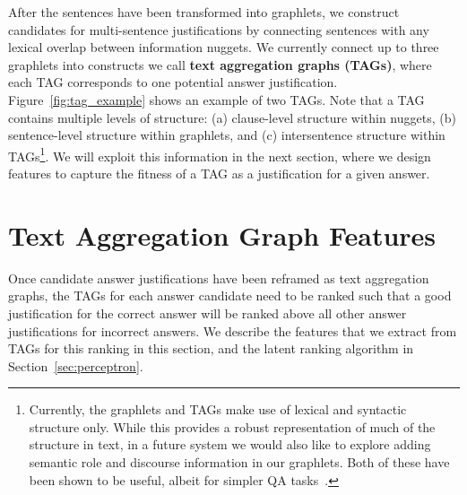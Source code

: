 After the sentences have been transformed into graphlets, we construct candidates for multi-sentence justifications by connecting sentences with any lexical overlap between information nuggets.  We currently connect up to three graphlets into constructs we call \textbf{text aggregation graphs (TAGs)}, where each TAG corresponds to one potential answer justification. 
Figure~\ref{fig:tag_example} shows an example of two TAGs. 
Note that a TAG contains multiple levels of structure: (a) clause-level structure within nuggets, (b) sentence-level structure within graphlets, and (c) intersentence structure within TAGs\footnote{Currently, the graphlets and TAGs make use of lexical and syntactic structure only.  While this provides a robust representation of much of the structure in text, in a future system we would also like to explore adding semantic role and discourse information in our graphlets. Both of these have been shown to be useful, albeit for simpler QA tasks~\cite{Surdeanu:11,jansen14}.}.  
We will exploit this information in the next section, where we design features to capture the fitness of a TAG as a justification for a given answer.



\section{Text Aggregation Graph Features}
\label{sec:scoring}

Once candidate answer justifications have been reframed as text aggregation graphs, the TAGs for each answer candidate need to be ranked such that a good justification for the correct answer will be ranked above all other answer justifications for incorrect answers. We describe the features that we extract from TAGs for this ranking in this section, and the latent ranking algorithm in Section~\ref{sec:perceptron}.




